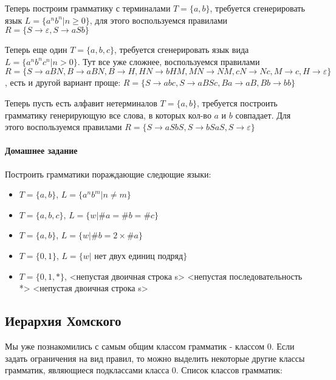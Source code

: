 Теперь построим грамматику с терминалами $T = \{a,b\}$, требуется сгенерировать язык $L = \{a^nb^n | n \ge 0\}$, для этого воспользуемся правилами $R = \{S \rightarrow \varepsilon, S \rightarrow aSb\}$

Теперь еще один $T = \{a,b,c\}$, требуется сгенерировать язык вида $L = \{a^nb^nc^n | n > 0\}$. Тут все уже сложнее, воспользуемся правилами $R = \{S \rightarrow aBN, B \rightarrow aBN, B \rightarrow H, HN \rightarrow bHM, MN \rightarrow NM, cN \rightarrow Nc, M \rightarrow c, H \rightarrow \varepsilon\}$, есть и другой вариант проще:
$R = \{S \rightarrow abc, S \rightarrow aBSc, Ba \rightarrow aB, Bb \rightarrow bb\}$

Теперь пусть есть алфавит нетерминалов $T = \{a,b\}$, требуется построить грамматику генерирующую все слова, в которых кол-во $a$ и $b$ совпадает. Для этого воспользуемся правилами $R = \{S \rightarrow aSbS, S \rightarrow bSaS, S \rightarrow \varepsilon\}$

\paragraph{Домашнее задание}
Построить грамматики пораждающие следющие языки:
\begin{itemize}
\item $T = \{a,b\}$, $L = \{a^nb^m | n\not= m\}$

\item $T = \{a,b,c\}$, $L = \{w | \#a = \#b = \#c\}$

\item $T = \{a,b\}$, $L = \{w | \#b = 2\times \#a\}$

\item $T = \{0,1\}$, $L = \{w | \text{ нет двух единиц подряд}\}$

\item $T = \{0,1,*\}$, <непустая двоичная строка s> <непустая последовательность *> <непустая двоичная строка s>
\end{itemize}

\subsection{Иерархия Хомского}

Мы уже познакомились с самым общим классом грамматик - классом 0. Если задать ограничения на вид правил, то можно выделить некоторые другие классы грамматик, являющиеся
подклассами класса 0. Список классов грамматик:

